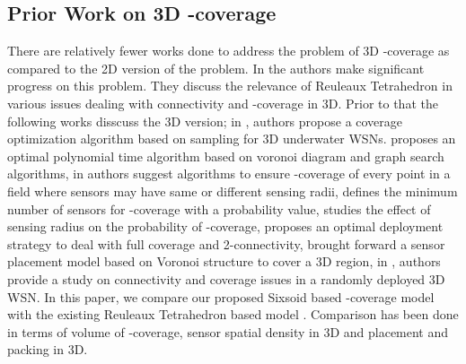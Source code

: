 \documentclass[conference]{IEEEtran}
\begin{document}
\subsection{Prior Work on 3D -coverage}
There are relatively fewer works done to address the problem of 3D -coverage as compared to the 2D version of the problem. In \cite{A,AD1} the authors make significant progress on this problem. They discuss the relevance of Reuleaux Tetrahedron in various issues dealing with connectivity and -coverage in 3D. Prior to that the following works disscuss the 3D version; in \cite{XLL}, authors propose a coverage optimization algorithm based on sampling for 3D underwater WSNs. \cite{MKPS} proposes an optimal polynomial time algorithm based on voronoi diagram and graph search algorithms, in \cite{HT} authors suggest algorithms to ensure -coverage of every point in a field  where sensors may have same or different sensing radii, \cite{KLB} defines the minimum number of sensors for -coverage with a probability value, \cite{WY} studies the effect of sensing radius on the probability of -coverage, \cite{BKXYL} proposes an optimal deployment strategy to deal with full coverage and 2-connectivity, \cite{AH} brought forward a sensor placement model based on Voronoi structure to cover a 3D region, in \cite{R}, authors provide a study on connectivity and coverage issues in a randomly deployed 3D WSN. In this paper, we compare our proposed Sixsoid based -coverage model with the existing Reuleaux Tetrahedron based model \cite{A}. Comparison has been done in terms of volume of -coverage, sensor spatial density in 3D and placement and packing in 3D. 
\end{document}
